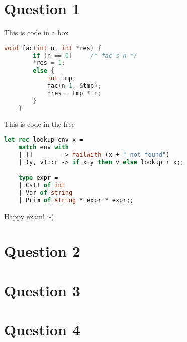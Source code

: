\documentclass{ituhandin}
\begin{document}
%
\maketitlepage
\signpage

\chapter*{Question 1}

This is code in a box

\begin{lstlisting}[language=C, caption=This is a caption]
    void fac(int n, int *res) {
        if (n == 0)     /* fac's n */
        *res = 1;
        else {
            int tmp;
            fac(n-1, &tmp);
            *res = tmp * n;
        }
    }
\end{lstlisting}


This is code in the free

\begin{lstlisting}[language=ML, frame={}]
    let rec lookup env x =
    match env with 
    | []        -> failwith (x + " not found")
    | (y, v)::r -> if x=y then v else lookup r x;;

    type expr = 
    | CstI of int
    | Var of string
    | Prim of string * expr * expr;;
\end{lstlisting}


Happy exam! :-)


\chapter*{Question 2}
\chapter*{Question 3}
\chapter*{Question 4}

\label{LastPage}
\end{document}
